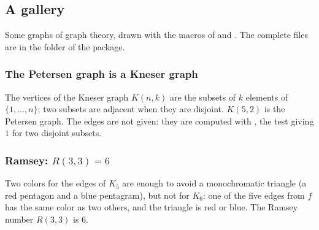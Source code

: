 \begin{tkzexample}
\end{tkzexample}

\newpage
\subsection{A gallery}
Some graphs of graph theory, drawn with the macros of 
and . The complete files are in the folder
 of the package.

\newpage
\subsubsection{The Petersen graph is a Kneser graph}
The vertices of the Kneser graph $K(n,k)$ are the subsets of $k$ elements of
$\{1,\dots,n\}$; two subsets are adjacent when they are disjoint. $K(5,2)$
is the Petersen graph. The edges are not given: they are computed with
, the test \tkzname{\&\&} giving $1$ for two
disjoint subsets.

\begin{tkzexample}[vbox]
\end{tkzexample}

\newpage
\subsubsection{Ramsey: $R(3,3)=6$}
Two colors for the edges of $K_5$ are enough to avoid a monochromatic
triangle (a red pentagon and a blue pentagram), but not for $K_6$: one of the
five edges from $f$ has the same color as two others, and the triangle is
red or blue. The Ramsey number $R(3,3)$ is $6$.


